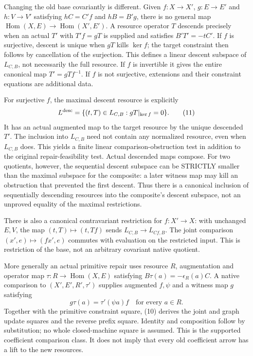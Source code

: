 \documentclass[11pt]{article}
\newcommand{\Hom}{\operatorname{Hom}}\newcommand{\im}{\operatorname{im}}
\begin{document}
Changing the old base covariantly is different. Given $f:X\to X'$, $g:E\to E'$ and $h:V\to V'$ satisfying $hC=C'f$ and $hB=B'g$, there is no general map $\Hom(X,E)\to\Hom(X',E')$. A resource operator $T$ descends precisely when an actual $T'$ with $T'f=gT$ is supplied and satisfies $B'T'=-tC'$. If $f$ is surjective, descent is unique when $gT$ kills $\ker f$; the target constraint then follows by cancellation of the surjection. This defines a linear descent subspace of $L_{C,B}$, not necessarily the full resource. If $f$ is invertible it gives the entire canonical map $T'=gTf^{-1}$. If $f$ is not surjective, extensions and their constraint equations are additional data.

For surjective $f$, the maximal descent resource is explicitly
\[
 L^{\rm desc}=\{(t,T)\in L_{C,B}:gT|_{\ker f}=0\}.\tag{11}
\]
It has an actual augmented map to the target resource by the unique descended $T'$. The inclusion into $L_{C,B}$ need not contain any normalized resource, even when $L_{C,B}$ does. This yields a finite linear comparison-obstruction test in addition to the original repair-feasibility test. Actual descended maps compose. For two quotients, however, the sequential descent subspace can be STRICTLY smaller than the maximal subspace for the composite: a later witness map may kill an obstruction that prevented the first descent. Thus there is a canonical inclusion of sequentially descending resources into the composite's descent subspace, not an unproved equality of the maximal restrictions.

There is also a canonical contravariant restriction for $f:X'\to X$: with unchanged $E,V$, the map $(t,T)\mapsto(t,Tf)$ sends $L_{C,B}\to L_{Cf,B}$. The joint comparison $(x',e)\mapsto(fx',e)$ commutes with evaluation on the restricted input. This is restriction of the base, not an arbitrary covariant native quotient.

More generally an actual primitive repair uses resource $R$, augmentation and operator map $\tau:R\to\Hom(X,E)$ satisfying $B\tau(a)=-\epsilon_R(a)C$. A native comparison to $(X',E',R',\tau')$ supplies augmented $f,\psi$ and a witness map $g$ satisfying
\[
 g\tau(a)=\tau'(\psi a)f\quad\text{for every }a\in R.\tag{10}
\]
Together with the primitive constraint square, (10) derives the joint and graph update squares and the reverse prefix square. Identity and composition follow by substitution; no whole closed-machine square is assumed. This is the supported coefficient comparison class. It does not imply that every old coefficient arrow has a lift to the new resources.
\end{document}
